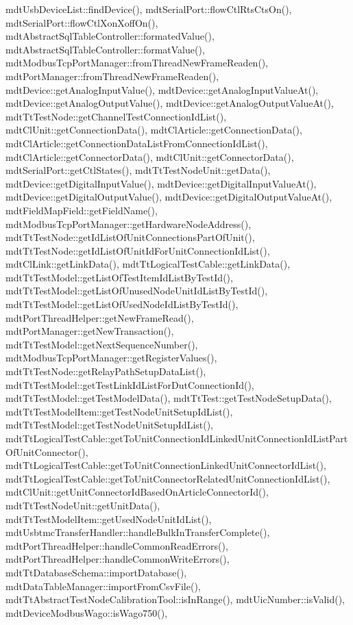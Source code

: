 mdt\-Usb\-Device\-List\-::find\-Device(), mdt\-Serial\-Port\-::flow\-Ctl\-Rts\-Cts\-On(), mdt\-Serial\-Port\-::flow\-Ctl\-Xon\-Xoff\-On(), mdt\-Abstract\-Sql\-Table\-Controller\-::formated\-Value(), mdt\-Abstract\-Sql\-Table\-Controller\-::format\-Value(), mdt\-Modbus\-Tcp\-Port\-Manager\-::from\-Thread\-New\-Frame\-Readen(), mdt\-Port\-Manager\-::from\-Thread\-New\-Frame\-Readen(), mdt\-Device\-::get\-Analog\-Input\-Value(), mdt\-Device\-::get\-Analog\-Input\-Value\-At(), mdt\-Device\-::get\-Analog\-Output\-Value(), mdt\-Device\-::get\-Analog\-Output\-Value\-At(), mdt\-Tt\-Test\-Node\-::get\-Channel\-Test\-Connection\-Id\-List(), mdt\-Cl\-Unit\-::get\-Connection\-Data(), mdt\-Cl\-Article\-::get\-Connection\-Data(), mdt\-Cl\-Article\-::get\-Connection\-Data\-List\-From\-Connection\-Id\-List(), mdt\-Cl\-Article\-::get\-Connector\-Data(), mdt\-Cl\-Unit\-::get\-Connector\-Data(), mdt\-Serial\-Port\-::get\-Ctl\-States(), mdt\-Tt\-Test\-Node\-Unit\-::get\-Data(), mdt\-Device\-::get\-Digital\-Input\-Value(), mdt\-Device\-::get\-Digital\-Input\-Value\-At(), mdt\-Device\-::get\-Digital\-Output\-Value(), mdt\-Device\-::get\-Digital\-Output\-Value\-At(), mdt\-Field\-Map\-Field\-::get\-Field\-Name(), mdt\-Modbus\-Tcp\-Port\-Manager\-::get\-Hardware\-Node\-Address(), mdt\-Tt\-Test\-Node\-::get\-Id\-List\-Of\-Unit\-Connections\-Part\-Of\-Unit(), mdt\-Tt\-Test\-Node\-::get\-Id\-List\-Of\-Unit\-Id\-For\-Unit\-Connection\-Id\-List(), mdt\-Cl\-Link\-::get\-Link\-Data(), mdt\-Tt\-Logical\-Test\-Cable\-::get\-Link\-Data(), mdt\-Tt\-Test\-Model\-::get\-List\-Of\-Test\-Item\-Id\-List\-By\-Test\-Id(), mdt\-Tt\-Test\-Model\-::get\-List\-Of\-Unused\-Node\-Unit\-Id\-List\-By\-Test\-Id(), mdt\-Tt\-Test\-Model\-::get\-List\-Of\-Used\-Node\-Id\-List\-By\-Test\-Id(), mdt\-Port\-Thread\-Helper\-::get\-New\-Frame\-Read(), mdt\-Port\-Manager\-::get\-New\-Transaction(), mdt\-Tt\-Test\-Model\-::get\-Next\-Sequence\-Number(), mdt\-Modbus\-Tcp\-Port\-Manager\-::get\-Register\-Values(), mdt\-Tt\-Test\-Node\-::get\-Relay\-Path\-Setup\-Data\-List(), mdt\-Tt\-Test\-Model\-::get\-Test\-Link\-Id\-List\-For\-Dut\-Connection\-Id(), mdt\-Tt\-Test\-Model\-::get\-Test\-Model\-Data(), mdt\-Tt\-Test\-::get\-Test\-Node\-Setup\-Data(), mdt\-Tt\-Test\-Model\-Item\-::get\-Test\-Node\-Unit\-Setup\-Id\-List(), mdt\-Tt\-Test\-Model\-::get\-Test\-Node\-Unit\-Setup\-Id\-List(), mdt\-Tt\-Logical\-Test\-Cable\-::get\-To\-Unit\-Connection\-Id\-Linked\-Unit\-Connection\-Id\-List\-Part\-Of\-Unit\-Connector(), mdt\-Tt\-Logical\-Test\-Cable\-::get\-To\-Unit\-Connection\-Linked\-Unit\-Connector\-Id\-List(), mdt\-Tt\-Logical\-Test\-Cable\-::get\-To\-Unit\-Connector\-Related\-Unit\-Connection\-Id\-List(), mdt\-Cl\-Unit\-::get\-Unit\-Connector\-Id\-Based\-On\-Article\-Connector\-Id(), mdt\-Tt\-Test\-Node\-Unit\-::get\-Unit\-Data(), mdt\-Tt\-Test\-Model\-Item\-::get\-Used\-Node\-Unit\-Id\-List(), mdt\-Usbtmc\-Transfer\-Handler\-::handle\-Bulk\-In\-Transfer\-Complete(), mdt\-Port\-Thread\-Helper\-::handle\-Common\-Read\-Errors(), mdt\-Port\-Thread\-Helper\-::handle\-Common\-Write\-Errors(), mdt\-Tt\-Database\-Schema\-::import\-Database(), mdt\-Data\-Table\-Manager\-::import\-From\-Csv\-File(), mdt\-Tt\-Abstract\-Test\-Node\-Calibration\-Tool\-::is\-In\-Range(), mdt\-Uic\-Number\-::is\-Valid(), mdt\-Device\-Modbus\-Wago\-::is\-Wago750(), 